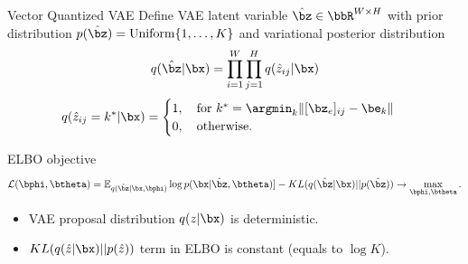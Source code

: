 \begin{frame}{Vector Quantized VAE}
	Define VAE latent variable $\hat{\bz} \in \bbR^{W \times H}$ with prior distribution $p(\hat{\bz}) = \text{Uniform}\{1, \dots, K\}$ and variational posterior distribution 
	\vspace{-0.3cm}
	\[
		q(\hat{\bz} | \bx) = \prod_{i=1}^W \prod_{j=1}^H q(\hat{z}_{ij} | \bx)
	\]
	\vspace{-0.3cm}
	\[
		q(\hat{z}_{ij} = k^* | \bx) = \begin{cases}
			1 , \quad \text{for } k^* = \argmin_k \| [\bz_e]_{ij} - \be_k \| \\
			0, \quad \text{otherwise}.
		\end{cases}
	\]
	\vspace{-0.5cm}
	\begin{block}{ELBO objective}
		\vspace{-0.5cm}
		\[
		 \mathcal{L} (\bphi, \btheta)  = \mathbb{E}_{q(\hat{\bz} | \bx, \bphi)} \log p(\bx | \hat{\bz}, \btheta)] - KL(q(\hat{\bz}| \bx) || p(\hat{\bz})) \rightarrow \max_{\bphi, \btheta}.
		\]	
		\vspace{-0.5cm}
	\end{block}
	\begin{itemize}
		\item VAE proposal distribution $q(z | \bx)$ is deterministic. 
		\item $KL(q(\hat{z}| \bx) || p(\hat{z}))$ term in ELBO is constant (equals to $\log K$).
	\end{itemize}
	
\end{frame}
